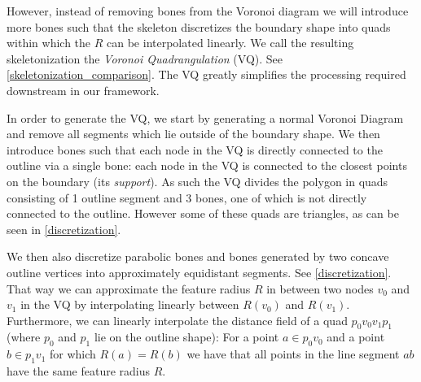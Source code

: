 However, instead of removing bones from the Voronoi diagram we will introduce more bones such that the skeleton discretizes the boundary shape into quads within which the $R$ can be interpolated linearly.
We call the resulting skeletonization the \emph{Voronoi Quadrangulation} (VQ).
See \cref{skeletonization_comparison}.
The VQ greatly simplifies the processing required downstream in our framework.

In order to generate the VQ, we start by generating a normal Voronoi Diagram and remove all segments which lie outside of the boundary shape.
We then introduce bones such that each node in the VQ is directly connected to the outline via a single bone:
each node in the VQ is connected to the closest points on the boundary (its \emph{support}).
As such the VQ divides the polygon in quads consisting of 1 outline segment and 3 bones, one of which is not directly connected to the outline.
However some of these quads are triangles, as can be seen in \cref{discretization}.

We then also discretize parabolic bones and bones generated by two concave outline vertices into approximately equidistant segments.
See \cref{discretization}.
That way we can approximate the feature radius $R$ in between two nodes $v_0$ and $v_1$ in the VQ by interpolating linearly between $R(v_0)$ and $R(v_1)$.
Furthermore, we can linearly interpolate the distance field of a quad $p_0v_0v_1p_1$ (where $p_0$ and $p_1$ lie on the outline shape):
For a point $a \in p_0v_0$ and a point $b \in p_1v_1$ for which $R(a) = R(b)$ we have that all points in the line segment $ab$ have the same feature radius $R$.

